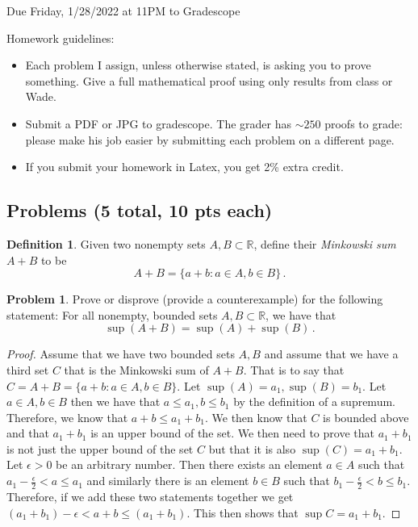 \documentclass[11pt]{article}
\theoremstyle{definition}
\newtheorem{problem}{Problem}
\newtheorem{definition}{Definition}
\newcommand{\R}{\mathbb{R}}
\begin{document}
  \hfill Due Friday, 1/28/2022 at 11PM to Gradescope

\bigskip

\noindent Homework guidelines: 
\begin{itemize}
\item Each problem I assign, unless otherwise stated, is asking you to prove something. Give a full mathematical proof using only results from class or Wade.
\item Submit a PDF or JPG to gradescope. The grader has $\sim 250$ proofs to grade:  please make his job easier by submitting each problem on a different page. 
\item If you submit your homework in Latex, you get 2\% extra credit. 
\end{itemize}

\subsection*{Problems (5 total, 10 pts each)}

\begin{definition}
Given two nonempty sets $A, B \subset \R$, define their \emph{Minkowski sum} $A + B$ to be
\[
A + B = \{ a + b : a \in A, b \in B\} \, .
\]
\end{definition}
\begin{problem}
Prove or disprove (provide a counterexample) for the following statement: For all nonempty, bounded sets $A, B \subset \R$, we have that 
\[
\sup(A + B) = \sup(A) + \sup(B) \,. 
\]
\end{problem}

\begin{proof}
Assume that we have two bounded sets $A,B$ and assume that we have a third set $C$ that is the Minkowski sum of $A+B$. That is to say that $C=A+B=\{a+b:a\in A, b\in B\}$. Let $\sup(A) = a_1, \sup(B) = b_1$. Let $a\in A, b\in B$ then we have that $a\leq a_1, b\leq b_1$ by the definition of a supremum. Therefore, we know that $a+b \leq a_1+b_1$. We then know that $C$ is bounded above and that $a_1+b_1$ is an upper bound of the set. We then need to prove that $a_1+b_1$ is not just the upper bound of the set $C$ but that it is also $\sup(C)=a_1+b_1.$ Let $\epsilon>0$ be an arbitrary number. Then there exists an element $a\in A$ such that $a_1-\frac{\epsilon}{2}<a\leq a_1$ and similarly there is an element $b\in B$ such that $b_1-\frac{\epsilon}{2}<b\leq b_1$. Therefore, if we add these two statements together we get $(a_1+b_1)-\epsilon<a+b\leq (a_1+b_1)$. This then shows that $\sup{C} = a_1+b_1$.
\end{proof}
\end{document}
